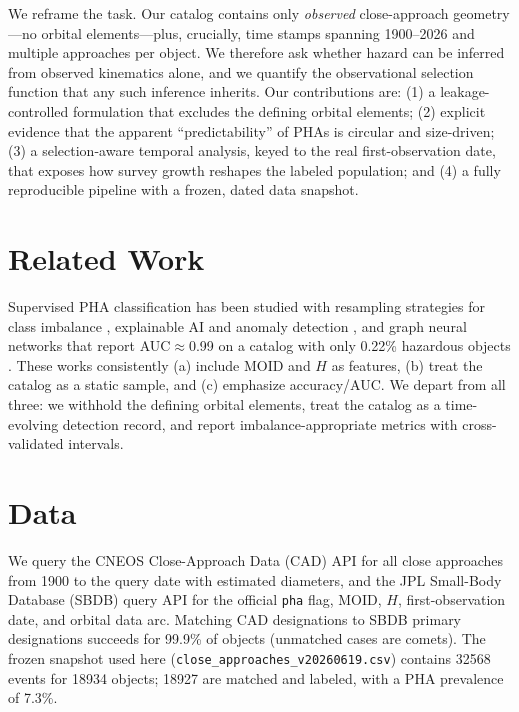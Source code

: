 \documentclass[11pt]{article}
\begin{document}
We reframe the task. Our catalog contains only \emph{observed} close-approach
geometry---no orbital elements---plus, crucially, time stamps spanning 1900--2026 and
multiple approaches per object. We therefore ask whether hazard can be inferred from
observed kinematics alone, and we quantify the observational selection function that
any such inference inherits. Our contributions are: (1) a leakage-controlled
formulation that excludes the defining orbital elements; (2) explicit evidence that
the apparent ``predictability'' of PHAs is circular and size-driven; (3) a
selection-aware temporal analysis, keyed to the real first-observation date, that
exposes how survey growth reshapes the labeled population; and (4) a fully
reproducible pipeline with a frozen, dated data snapshot.

\section{Related Work}
Supervised PHA classification has been studied with resampling strategies for class
imbalance \citep{neo_resampling2025}, explainable AI and anomaly detection
\citep{neo_xai2025}, and graph neural networks that report AUC$\approx$0.99 on a
catalog with only 0.22\% hazardous objects \citep{neo_gnn2025}. These works
consistently (a) include MOID and $H$ as features, (b) treat the catalog as a static
sample, and (c) emphasize accuracy/AUC. We depart from all three: we withhold the
defining orbital elements, treat the catalog as a time-evolving detection record, and
report imbalance-appropriate metrics with cross-validated intervals.

\section{Data}
We query the CNEOS Close-Approach Data (CAD) API \citep{cneos_cad} for all close
approaches from 1900 to the query date with estimated diameters, and the JPL
Small-Body Database (SBDB) query API \citep{jpl_sbdb} for the official \texttt{pha}
flag, MOID, $H$, first-observation date, and orbital data arc. Matching CAD
designations to SBDB primary designations succeeds for 99.9\% of objects (unmatched
cases are comets). The frozen snapshot used here
(\texttt{close\_approaches\_v20260619.csv}) contains \num{32568} events for
\num{18934} objects; \num{18927} are matched and labeled, with a PHA prevalence of
7.3\%.
\end{document}
